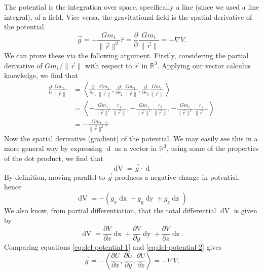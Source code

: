 The potential is the integration over space, specifically a line (since we used a line integral), of a field. Vice versa, the gravitational field is the spatial derivative of the potential.     
\begin{equation}
    \vec{g} = -\frac{Gm_1}{\| \vec{r} \|^2}\hat{r} = \frac{\partial}{\mathop{\partial \vec{r}}} \frac{G m_1}{\| \vec{r} \|} = - \nabla V.
\end{equation}
We can prove these via the following argument. Firstly, considering the partial derivative of $G m_1 / \| \vec{r} \|$ with respect to $\vec{r}$ in $\mathbb{R}^3$. Applying our vector calculus knowledge, we find that
\begin{align*}
    \frac{\partial}{\mathop{\partial \vec{r}}} \frac{G m_1}{\| \vec{r} \|} &= \left\langle
        \frac{\partial}{\partial r_1} \frac{G m_1}{\| \vec{r} \|} ,
        \frac{\partial}{\partial r_2} \frac{G m_1}{\| \vec{r} \|} ,
        \frac{\partial}{\partial r_3} \frac{G m_1}{\| \vec{r} \|}
    \right\rangle \\
    &= \left\langle
        - \frac{G m_1}{\| \vec{r} \|^2} \frac{r_1}{\| \vec{r} \|} ,
        - \frac{G m_1}{\| \vec{r} \|^2} \frac{r_2}{\| \vec{r} \|} ,
        - \frac{G m_1}{\| \vec{r} \|^2} \frac{r_1}{\| \vec{r} \|}
    \right\rangle  \\
    &= - \frac{G m_1}{\| \vec{r} \|^2} \hat{r}
\end{align*}
Now the spatial derivative (gradient) of the potential. We may easily see this in a more general way by expressing $\mathop{\mathrm{d}\vec{r}}$ as a vector in $\mathbb{R}^3$, using some of the properties of the dot product, we find that
\begin{equation*}
    \mathop{\mathrm{d}V} = \vec{g} \cdot \mathop{\mathrm{d}\vec{r}}
\end{equation*}
By definition, moving parallel to $\vec{g}$ produces a negative change in potential, hence
\begin{equation}
    \label{eq:del-potential-1}
    \mathop{\mathrm{d}V} = -\left(g_x \mathop{\mathrm{d}x} + g_y \mathop{\mathrm{d}y} + g_z \mathop{\mathrm{d}z}\right)
\end{equation}
We also know, from partial differentiation, that the total differential $\mathop{\mathrm{d}V}$ is given by
\begin{equation}
    \label{eq:del-potential-2}
    \mathop{\mathrm{d}V} = \frac{\partial V}{\partial x}\mathop{\mathrm{d}x} + \frac{\partial V}{\partial y}\mathop{\mathrm{d}y} + \frac{\partial V}{\partial z}\mathop{\mathrm{d}z}.
\end{equation}
Comparing equations \ref{eq:del-potential-1} and \ref{eq:del-potential-2} gives
\begin{equation}
    \vec{g} = - \left\langle \frac{\partial U}{\partial x}, \frac{\partial U}{\partial y}, \frac{\partial U}{\partial z} \right\rangle = - \nabla V.
\end{equation}

